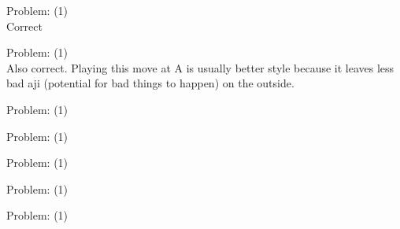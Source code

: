 \documentclass[11pt]{article}
\begin{document}
\begin{minipage}[t]{0.5\textwidth}
  {\centering
  
  Problem: (1)\\
  Correct\\
  }
\end{minipage}
\begin{minipage}[t]{0.5\textwidth}
  {\centering
  
  Problem: (1)\\
  Also correct. Playing this move at A is usually better style because it leaves less bad aji (potential for bad things to happen) on the outside.\\
  }
\end{minipage}
\begin{minipage}[t]{0.5\textwidth}
  {\centering
  
  Problem: (1)\\
  
  }
\end{minipage}
\begin{minipage}[t]{0.5\textwidth}
  {\centering
  
  Problem: (1)\\
  
  }
\end{minipage}
\begin{minipage}[t]{0.5\textwidth}
  {\centering
  
  Problem: (1)\\
  
  }
\end{minipage}
\begin{minipage}[t]{0.5\textwidth}
  {\centering
  
  Problem: (1)\\
  
  }
\end{minipage}
\begin{minipage}[t]{0.5\textwidth}
  {\centering
  
  Problem: (1)\\
  
  }
\end{minipage}
\end{document}
